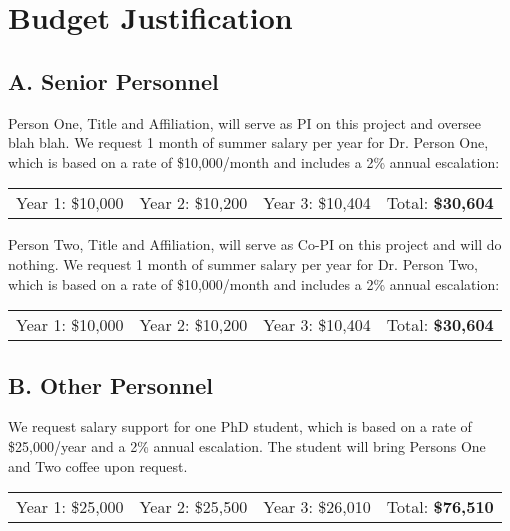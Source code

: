 \section*{Budget Justification}

\subsection*{A. Senior Personnel}

 Person One, Title and Affiliation, will serve as PI on this project and oversee blah blah. We request 1 month of summer salary per year for Dr. Person One, which is based on a rate of \$10,000/month and includes a 2\% annual escalation:
\newline
\begin{table}[h]
\begin{tabular}[c]{cccc}
Year 1: \$10,000 & Year 2: \$10,200 & Year 3: \$10,404 & Total: \textbf{\$30,604}
\end{tabular}
\end{table}
\newline
\newline
{} Person Two, Title and Affiliation, will serve as Co-PI on this project and will do nothing. We request 1 month of summer salary per year for Dr. Person Two, which is based on a rate of \$10,000/month and includes a 2\% annual escalation:
\newline
\begin{table}[h]
\begin{tabular}[c]{cccc}
Year 1: \$10,000 & Year 2: \$10,200 & Year 3: \$10,404 & Total: \textbf{\$30,604}
\end{tabular}
\end{table}

\subsection*{B. Other Personnel}
 We request salary support for one PhD student, which is based on a rate of \$25,000/year and a 2\% annual escalation. The student will bring Persons One and Two coffee upon request.
\newline
\begin{table}[h]
\begin{tabular}[c]{cccc}
Year 1: \$25,000 & Year 2: \$25,500 & Year 3: \$26,010 & Total: \textbf{\$76,510}
\end{tabular}
\end{table}

